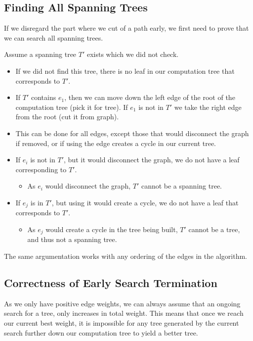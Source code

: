 \subsection{Finding All Spanning Trees}

If we disregard the part where we cut of a path early, we first need to prove that we can search all spanning trees.

\noindent
Assume a spanning tree $T'$ exists which we did not check.

\begin{itemize}
\item If we did not find this tree, there is no leaf in our computation tree that corresponds to $T'$.

\item If $T'$ contains $e_1$, then we can move down the left edge of the root of the computation tree (pick it for tree). If $e_1$ is not in $T'$ we take the right edge from the root (cut it from graph).

\item This can be done for all edges, except those that would disconnect the graph if removed, or if using the edge creates a cycle in our current tree.

\item If $e_i$ is not in $T'$, but it would disconnect the graph, we do not have a leaf corresponding to $T'$.
\begin{itemize}
\item As $e_i$ would disconnect the graph, $T'$ cannot be a spanning tree.
\end{itemize}

\item If $e_j$ is in $T'$, but using it would create a cycle, we do not have a leaf that corresponds to $T'$.

\begin{itemize}
\item As $e_j$ would create a cycle in the tree being built, $T'$ cannot be a tree, and thus not a spanning tree.
\end{itemize}
\end{itemize}

The same argumentation works with any ordering of the edges in the algorithm.

\subsection{Correctness of Early Search Termination}
As we only have positive edge weights, we can always assume that an ongoing search for a tree, only increases in total weight. This means that once we reach our current best weight, it is impossible for any tree generated by the current search further down our computation tree to yield a better tree.

